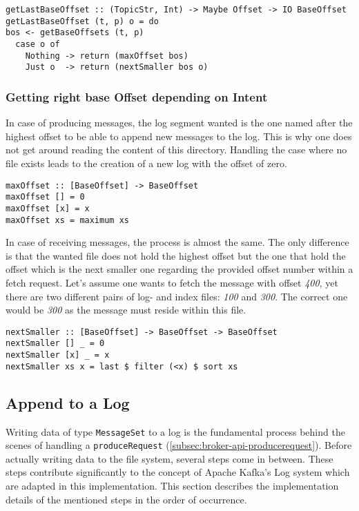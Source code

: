 \begin{lstlisting}[caption={Get highest base offset existing of given topic and partition}]
getLastBaseOffset :: (TopicStr, Int) -> Maybe Offset -> IO BaseOffset
getLastBaseOffset (t, p) o = do
bos <- getBaseOffsets (t, p)
  case o of
    Nothing -> return (maxOffset bos)
    Just o  -> return (nextSmaller bos o)
\end{lstlisting}

\subsubsection{Getting right base Offset depending on Intent}
In case of producing messages, the log segment wanted is the one named after the
highest offset to be able to append new messages to the log. This is why one
does not get around reading the content of this directory. Handling the case
where no file exists leads to the creation of a new log with the offset of zero.

\begin{lstlisting}[caption={Determining highest offset of given list}]
maxOffset :: [BaseOffset] -> BaseOffset
maxOffset [] = 0
maxOffset [x] = x
maxOffset xs = maximum xs
\end{lstlisting}

In case of receiving messages, the process is almost the same. The only
difference is that the wanted file does not hold the highest offset but the one
that hold the offset which is the next smaller one regarding the provided offset
number within a fetch request. Let's assume one wants to fetch the message with
offset \textit{400}, yet there are two different pairs of log- and index
files: \textit{100} and \textit{300}. The correct one would be \textit{300} as the
message must reside within this file.

\begin{lstlisting}[caption={Determining offset which is next smaller regarding given offset}]
nextSmaller :: [BaseOffset] -> BaseOffset -> BaseOffset
nextSmaller [] _ = 0
nextSmaller [x] _ = x
nextSmaller xs x = last $ filter (<x) $ sort xs
\end{lstlisting}

\subsection{Append to a Log}
\label{subsec:broker-log-append}

Writing data of type \lstinline{MessageSet} to a log is the fundamental process behind the
scenes of handling a \lstinline{produceRequest}
(\ref{subsec:broker-api-producerequest}). Before actually writing data to the
file system, several steps come in between. These steps contribute significantly to the
concept of Apache Kafka's Log system which are adapted in this implementation.
This section describes the implementation details of the mentioned steps in the
order of occurrence.

